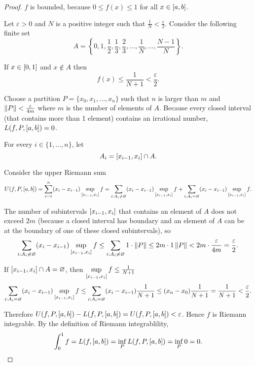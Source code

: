 \begin{proof}
    $f$ is bounded, because $0\leq f(x)\leq 1$ for all $x\in\left[{a, b}\right]$.

    Let $\varepsilon > 0$ and $N$ is a positive integer such that $\frac{1}{N} < \frac{\varepsilon}{2}$. Consider the following finite set
    \[
        A = \left\{ 0, 1, \frac{1}{2}, \frac{1}{3}, \frac{2}{3}, \ldots, \frac{1}{N}, \ldots, \frac{N-1}{N} \right\}.
    \]

    If $x\in\left[{0,1}\right]$ and $x\notin A$ then
    \[
        f(x) \leq \frac{1}{N+1} < \frac{\varepsilon}{2}.
    \]

    Choose a partition $P = \{ x_{0}, x_{1}, \ldots, x_{n} \}$ such that $n$ is larger than $m$ and $\left\Vert{P}\right\Vert < \frac{\varepsilon}{4m}$ where $m$ is the number of elements of $A$. Because every closed interval (that contains more than 1 element) contains an irrational number, $L(f, P, \left[{a, b}\right]) = 0$.

    For every $i\in\{ 1,\ldots, n \}$, let
    \[
        A_{i} = \left[{x_{i-1}, x_{i}}\right]\cap A.
    \]

    Consider the upper Riemann sum
    \[
        U(f, P, \left[{a, b}\right]) = \sum^{n}_{i=1}(x_{i} - x_{i-1})\sup\limits_{\left[{x_{i-1},x_{i}}\right]}f = \sum_{i: A_{i}\ne\varnothing}(x_{i} - x_{i-1})\sup\limits_{\left[{x_{i-1},x_{i}}\right]}f + \sum_{i: A_{i}=\varnothing}(x_{i} - x_{i-1})\sup\limits_{\left[{x_{i-1},x_{i}}\right]}f.
    \]

    The number of subintervals $\left[{x_{i-1}, x_{i}}\right]$ that contains an element of $A$ does not exceed $2m$ (because a closed interval has boundary and an element of $A$ can be at the boundary of one of these closed subintervals), so
    \[
        \sum_{i: A_{i}\ne\varnothing}(x_{i} - x_{i-1})\sup\limits_{\left[{x_{i-1},x_{i}}\right]}f \leq \sum_{i: A_{i}\ne\varnothing} 1\cdot \left\Vert{P}\right\Vert \leq 2m\cdot 1\left\Vert{P}\right\Vert < 2m \cdot \frac{\varepsilon}{4m} = \frac{\varepsilon}{2}.
    \]

    If $\left[{x_{i-1}, x_{i}}\right]\cap A = \varnothing$, then $\sup\limits_{\left[{x_{i-1},x_{i}}\right]}f\leq \frac{1}{N+1}$
    \[
        \sum_{i: A_{i}=\varnothing}(x_{i} - x_{i-1})\sup\limits_{\left[{x_{i-1},x_{i}}\right]}f \leq \sum_{i: A_{i}=\varnothing}(x_{i} - x_{i-1})\frac{1}{N+1} \leq (x_{n} - x_{0})\frac{1}{N+1} = \frac{1}{N+1} < \frac{\varepsilon}{2}.
    \]

    Therefore $U(f, P, \left[{a, b}\right]) - L(f, P, \left[{a, b}\right]) = U(f, P, \left[{a, b}\right]) < \varepsilon$. Hence $f$ is Riemann integrable. By the definition of Riemann integrablility,
    \[
        \int^{1}_{0}f = L(f, \left[{a, b}\right]) = \inf\limits_{P}L(f, P, \left[{a, b}\right]) = \inf\limits_{P}0 = 0.
    \]
\end{proof}
\newpage

